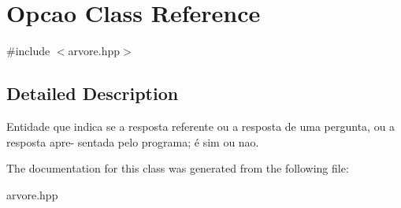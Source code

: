 \hypertarget{classOpcao}{}\section{Opcao Class Reference}
\label{classOpcao}


{\ttfamily \#include $<$arvore.\+hpp$>$}



\subsection{Detailed Description}
Entidade que indica se a resposta referente ou a resposta de uma pergunta, ou a resposta apre-\/ sentada pelo programa; é sim ou nao. 

The documentation for this class was generated from the following file\+:\begin{DoxyCompactItemize}
\item 
arvore.\+hpp\end{DoxyCompactItemize}
